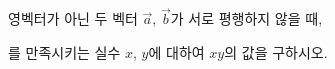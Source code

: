 영벡터가 아닌 두 벡터 $\vec{a}$, $\vec{b}$가 서로 평행하지 않을 때, \par\smallskip{}\par\smallskip\noindent 를 만족시키는 실수 $x$, $y$에 대하여 $xy$의 값을 구하시오.
